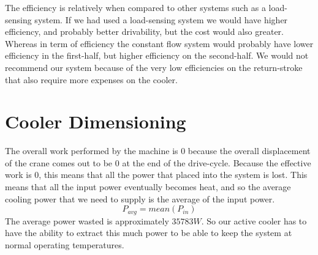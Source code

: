 \documentclass[12pt]{article}
\begin{document}
            The efficiency is relatively when compared to other systems such as a load-sensing system. If we had used a load-sensing system we would have higher efficiency, and probably better drivability, but the cost would also greater. Whereas in term of efficiency the constant flow system would probably have lower efficiency in the first-half, but higher efficiency on the second-half.
            We would not recommend our system because of the very low efficiencies on the return-stroke that also require more expenses on the cooler.

    \section{Cooler Dimensioning}
            The overall work performed by the machine is 0 because the overall displacement of the crane comes out to be 0 at the end of the drive-cycle.
            Because the effective work is 0, this means that all the power that placed into the system is lost. This means that all the input power eventually becomes heat, and so the average cooling power that we need to supply is the average of the input power.
            \begin{equation*}
                P_{avg} = mean(P_{in})
            \end{equation*}
            The average power wasted is approximately $35783 W$. So our active cooler has to have the ability to extract this much power to be able to keep the system at normal operating temperatures.
\end{document}
